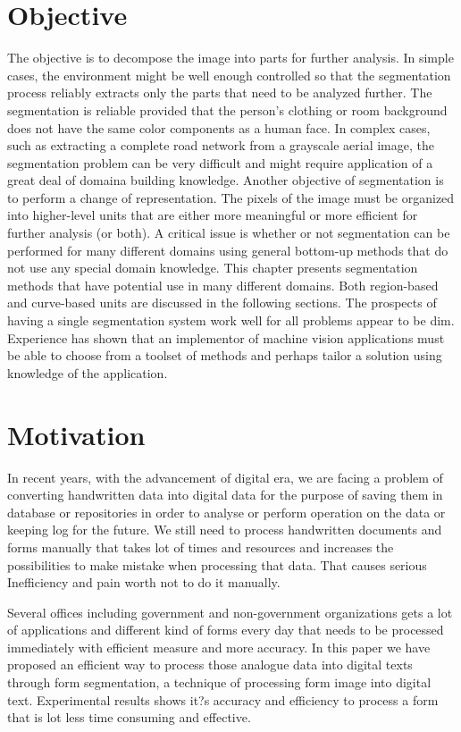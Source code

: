 \section{Objective}
The objective is to decompose the image into parts for further analysis. In simple cases, the environment might be well enough controlled so that the segmentation process reliably extracts only the parts that need to be analyzed further. The segmentation is reliable provided that the person's clothing or room background does not have the same color components as a human face. In complex cases, such as extracting a complete road network from a grayscale aerial image, the segmentation problem can be very difficult and might require application of a great deal of domaina building knowledge.
Another objective of segmentation is to perform a change of representation. The pixels of the image must be organized into higher-level units that are either more meaningful or more efficient for further analysis (or both). A critical issue is whether or not segmentation can be performed for many different domains using general bottom-up methods that do not use any special domain knowledge. This chapter presents segmentation methods that have potential use in many different domains. Both region-based and curve-based units are discussed in the following sections. The prospects of having a single segmentation system work well for all problems appear to be dim. Experience has shown that an implementor of machine vision applications must be able to choose from a toolset of methods and perhaps tailor a solution using knowledge of the application.
\section{Motivation}
In recent years, with the advancement of digital era, we are facing a problem of converting handwritten data into digital data for the purpose of saving them in database or repositories in order to analyse or perform operation on the data or keeping log for the future. We still need to process handwritten documents and forms manually that takes lot of times and resources and increases the possibilities to make mistake when processing that data. That causes serious Inefficiency and pain worth not to do it manually.

Several offices including government and non-government organizations gets a lot of applications and different kind of forms every day that needs to be processed immediately with efficient measure and more accuracy. 
In this paper we have proposed an efficient way to process those analogue data into digital texts through form segmentation, a technique of processing form image into digital text. Experimental results shows it?s accuracy and efficiency to process a form that is lot less time consuming and effective.  

